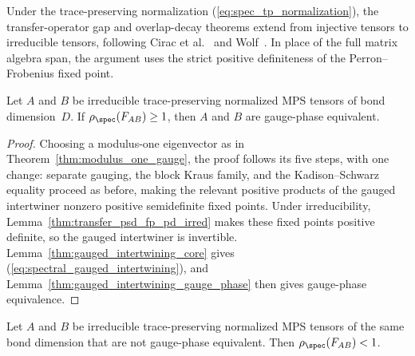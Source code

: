 Under the trace-preserving normalization (\ref{eq:spec_tp_normalization}), the
transfer-operator gap and overlap-decay theorems extend from injective tensors
to irreducible tensors, following Cirac et al.~\cite{Cirac2016MPDO_arXiv} and
Wolf~\cite[Section~6.2]{Wolf2012Quantum}. In place of the full matrix algebra
span, the argument uses the strict positive definiteness of the Perron--Frobenius
fixed point.

\begin{lemma}
    \label{thm:modulus_one_gauge_irr_tp}
    \leanok
    Let $A$ and $B$ be irreducible trace-preserving normalized MPS tensors
    of bond dimension~$D$. If $\rho_{\spec}(F_{AB})\geq1$, then $A$ and $B$
    are gauge-phase equivalent.
\end{lemma}

\begin{proof}
    \leanok
    Choosing a modulus-one eigenvector as in
    Theorem~\ref{thm:modulus_one_gauge}, the proof follows its five steps,
    with one change: separate gauging, the block Kraus family, and the
    Kadison--Schwarz equality proceed as before, making the
    relevant positive products of the gauged intertwiner nonzero
    positive semidefinite fixed points. Under irreducibility,
    Lemma~\ref{thm:transfer_psd_fp_pd_irred} makes these fixed points positive
    definite, so the gauged intertwiner is invertible.
    Lemma~\ref{thm:gauged_intertwining_core} gives
    (\ref{eq:spectral_gauged_intertwining}), and
    Lemma~\ref{thm:gauged_intertwining_gauge_phase} then gives gauge-phase
    equivalence.
\end{proof}

\begin{lemma}%
    \label{thm:transfer_operator_gap_irr_tp}
    \leanok
    Let $A$ and $B$ be irreducible trace-preserving normalized MPS tensors
    of the same bond dimension that are not gauge-phase equivalent. Then
    $\rho_{\spec}(F_{AB})<1$.
\end{lemma}

